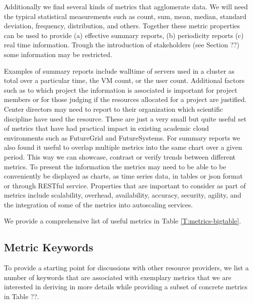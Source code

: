 \documentclass{sig-alternate-05-2015}
\begin{document}
Additionally we find several kinds of metrics that agglomerate data. We will need the typical statistical measurements such as count, sum, mean, median, standard deviation, frequency, distribution, and others. Together these metric properties can be used to provide (a) effective summary reports, (b) periodicity reports (c) real time information. Trough the introduction of stakeholders (see Section ??)  some information may be restricted.

Examples of summary reports include walltime of servers used in a cluster as total over a particular time, the VM count, or the user count. Additional factors such as to which project the information is associated is important for project members or for those judging if the resources allocated for a project are justified. Center directors may need to report to their organization which scientific discipline have used the resource. These are just a very small but quite useful set of metrics that have had practical impact in existing academic cloud environments such as FutureGrid and FutureSystems.  For summary reports we also found it useful to overlap multiple metrics into the same chart over a given period. This way we can showcase, contrast or verify trends between different metrics.  To present the information the metrics may need to be able to be conveniently be displayed as charts, as time series data, in tables or json format or through RESTful service.  Properties that are important to consider as part of metrics include scalability, overhead, availability, accuracy, security, agility, and the integration of some of the metrics into autoscaling services.

We provide a comprehensive list of useful metrics in Table \ref{T:metrics-bigtable}.

\subsection{Metric Keywords}

To provide a starting point for discussions with other resource providers, we list a number of keywords that are associated with exemplary metrics that we are interested in deriving in more details while providing a subset of concrete metrics in Table ??.
\end{document}
